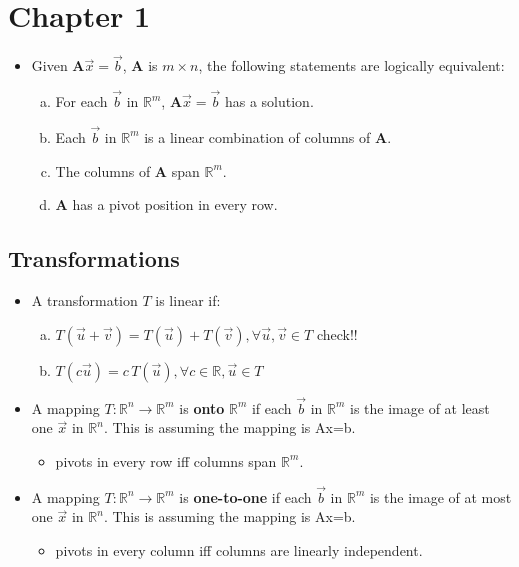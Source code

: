 \documentclass[11pt]{article}
\newcommand{\Thm}{\fbox{Thm}}
\newcommand{\Def}{\fbox{Def}}
\newcommand{\R}{\mathbb{R}}
\newcommand{\A}{\mathbf{A}}
\begin{document}
\maketitle

\section{Chapter 1}

\begin{itemize}
\item[\Thm]
Given $\A\vec{x} = \vec{b}$, $\A$ is $m \times n$, the following statements are logically equivalent: 
\begin{enumerate} [a)]
  \item For each $\vec{b}$ in $\R^m$, $\A \vec{x} = \vec{b}$ has a solution.
  \item Each $\vec{b}$ in $\R^m$ is a linear combination of columns of $\mathbf{A}$.
  \item The columns of $\A$ span $\R^m$.
  \item $\A$ has a pivot position in every row.
\end{enumerate}

\end{itemize}


\subsection{Transformations}

\begin{itemize}
\item[\Def]
A transformation $T$ is linear if:
\begin{enumerate} [a)]
  \item $T(\vec{u} + \vec{v}) = T(\vec{u}) + T(\vec{v}), \forall \vec{u}, \vec{v} \in T$  
  check!!
  \item $T(c \vec{u}) = c \, T(\vec{u}), \forall c \in \R, \vec{u} \in T$
\end{enumerate}

\item[\Def] A mapping $T:\R^n \rightarrow \R^m$ is \textbf{onto} $\R^m$ if each 
$\vec{b}$ in $\R^m$ is the image of at least one $\vec{x}$ in $\R^n$.
This is assuming the mapping is Ax=b.
\begin{itemize}
  \item pivots in every row iff columns span $\R^m$.
\end{itemize}

\item[\Def] A mapping $T:\R^n \rightarrow \R^m$ is \textbf{one-to-one} if each 
$\vec{b}$ in $\R^m$ is the image of at most one $\vec{x}$ in $\R^n$.
This is assuming the mapping is Ax=b.
\begin{itemize}
  \item pivots in every column iff columns are linearly independent.
\end{itemize}

\end{itemize}
\end{document}
